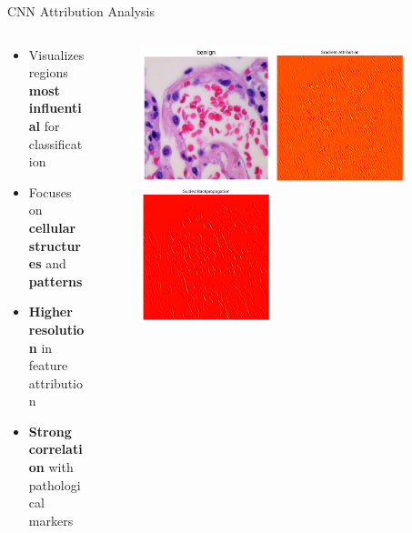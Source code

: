 \documentclass[aspectratio=169,8pt]{beamer}  %
\begin{document}
\begin{frame}{CNN Attribution Analysis}
\begin{columns}[T]
\begin{column}{0.5\textwidth}
\begin{itemize}
\item Visualizes regions \textbf{most influential} for classification
\item Focuses on \textbf{cellular structures} and \textbf{patterns}
\item \textbf{Higher resolution} in feature attribution
\item \textbf{Strong correlation} with pathological markers
\end{itemize}
\end{column}
\begin{column}{0.5\textwidth}
\begin{figure}
\includegraphics[width=0.45\textwidth]{imgs/normal_image.png}
\vspace{0.2cm}
\includegraphics[width=0.45\textwidth]{imgs/cnn_bp.png}
\vspace{0.2cm}
\includegraphics[width=0.45\textwidth]{imgs/cnn_gbp.png}

\end{figure}
\end{column}
\end{columns}
\end{frame}
\end{document}
